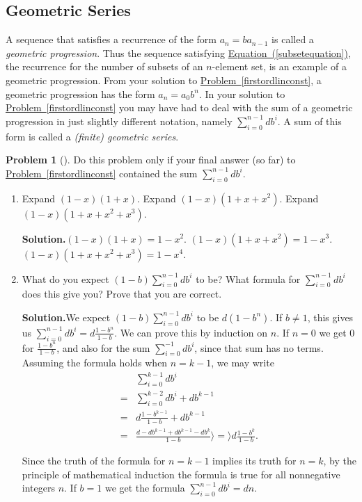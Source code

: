 \documentclass[10pt,]{book}
\theoremstyle{plain}
\theoremstyle{definition}
\newtheorem{activity}[project]{Problem}
\theoremstyle{definition}
\numberwithin{equation}{chapter}
\newcommand{\amp}{&}
\begin{document}
\subsection[{Geometric Series}]{Geometric Series}\label{subsection-14}
A sequence that satisfies a recurrence of the form \(a_n=ba_{n-1}\) is called a \emph{geometric progression}. Thus the sequence satisfying \hyperref[subsetequation]{Equation~(\ref{subsetequation})}, the recurrence for the number of subsets of an \(n\)-element set, is an example of a geometric progression. From your solution to \hyperref[firstordlinconst]{Problem~\ref{firstordlinconst}}, a geometric progression has the form \(a_n=a_0b^n\). In your solution to \hyperref[firstordlinconst]{Problem~\ref{firstordlinconst}} you may have had to deal with the sum of a geometric progression in just slightly different notation, namely \(\sum_{i=0}^{n-1}db^i\). A sum of this form is called a \emph{(finite) geometric series}.%
\begin{activity}[]\label{sumgeometricseries}
Do this problem only if your final answer (so far) to \hyperref[firstordlinconst]{Problem~\ref{firstordlinconst}} contained the sum \(\sum_{i=0}^{n-1}db^i\).%
\begin{enumerate}[font=\bfseries,label=(\alph*),ref=\alph*]
\item\label{task-85} Expand \((1-x)(1+x)\).  Expand \((1-x)(1+x+x^2)\). Expand \((1-x)(1+x+x^2+x^3)\).%
\par\medskip\noindent%
\textbf{Solution.}\quad \((1-x)(1+x)=1-x^2\). \((1-x)(1+x+x^2)=1-x^3\). \((1-x)(1+x+x^2+x^3)=1-x^4\).%
\item\label{task-86} What do you expect \((1-b)\sum_{i=0}^{n-1} db^i\) to be?  What formula for \(\sum_{i=0}^{n-1}db^i\) does this give you?  Prove that you are correct.%
\par\medskip\noindent%
\textbf{Solution.}\quad We expect \((1-b)\sum_{i=0}^{n-1} db^i\) to be \(d(1-b^n)\). If \(b\not=1\), this gives us \(\sum_{i=0}^{n-1}db^i=d\frac{1-b^n}{1-b}.\) We can prove this by induction on \(n\). If \(n=0\) we get 0 for \(\frac{1-b^n}{1-b}\), and also for the sum \(\sum_{i=0}^{-1}db^i\), since that sum has no terms. Assuming the formula holds when \(n=k-1\), we may write%
\begin{align*}
\amp \sum_{i=0}^{k-1} db^i\\
=\amp \sum_{i=0}^{k-2}db^i+db^{k-1}\\
=\amp d\frac{1-b^{k-1}}{1-b}+db^{k-1}\\
=\amp \frac{d-db^{k-1}  +db^{k-1}-db^k}{1-b}\rangle =\rangle  d\frac{1-b^k}{1-b}.
\end{align*}
%
\par
Since the truth of the formula for \(n=k-1\) implies its truth for \(n=k\), by the principle of mathematical induction the formula is true for all nonnegative integers \(n\). If \(b=1\) we get the formula \(\sum_{i=0}^{n-1}db^i=dn\).%
\end{enumerate}
\end{activity}
\end{document}
